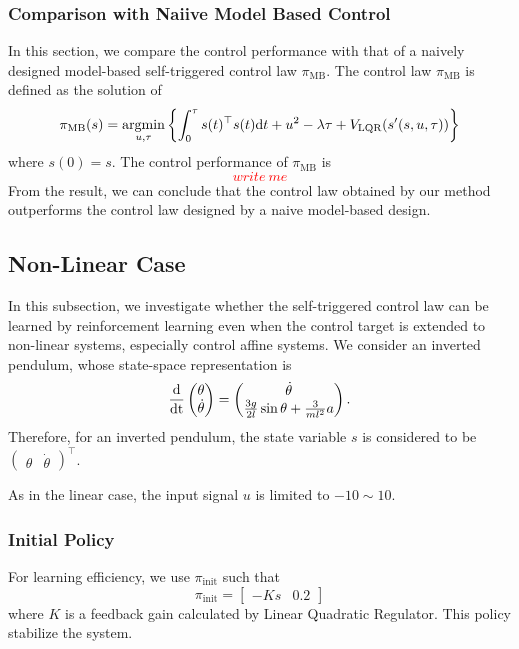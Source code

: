 \documentclass[english, dvipdfmx]{ampmt}             %
\newcommand{\unc}[1]{\textcolor{red}{#1}} %
\newcommand{\argmin}{\mathop{\rm argmin}\limits}
\newcommand{\odif}[2]{\frac{\rm{d}#1}{\rm{d}#2}}
\begin{document}
\subsubsection{Comparison with Naiive Model Based Control}
In this section, we compare the control performance with that of a naively designed model-based self-triggered control law $\pi_{\textrm{MB}}$. The control law $\pi_{\textrm{MB}}$ is defined as the solution of 
\begin{equation}
	\pi_{\textrm{MB}}(s) = \argmin_{u,\tau} \left\{\int_{0}^{\tau} s(t)^{\top}s(t)\textrm{d}t + u^2 - \lambda\tau + V_{\textrm{LQR}}(s^{\prime}(s,u,\tau))\right\}
\end{equation}
where $s(0) = s$. The control performance of $\pi_{\textrm{MB}}$ is 
\unc{
\begin{equation}
	write~me
\end{equation}
}
From the result, we can conclude that the control law obtained by our method outperforms the control law designed by a naive model-based design.


\subsection{Non-Linear Case}
In this subsection, we investigate whether the self-triggered control law can be learned by reinforcement learning even when the control target is extended to non-linear systems, especially control affine systems. We consider an inverted pendulum, whose state-space representation is
\begin{equation}
	\odif{}{t}\begin{pmatrix}\theta \\ \dot{\theta}\end{pmatrix} = 
		\begin{pmatrix}\dot{\theta} \\ \frac{3g}{2l}\sin{\theta} + \frac{3}{ml^2}a \end{pmatrix} \label{pendulum}.
\end{equation}
Therefore, for an inverted pendulum, the state variable $s$ is considered to be $\begin{pmatrix}\theta & \dot{\theta}\end{pmatrix}^{\top}$.
\par
As in the linear case, the input signal $u$ is limited to $-10 \sim 10$.

\subsubsection{Initial Policy}
For learning efficiency, we use $\pi_{\textrm{init}}$ such that
\begin{equation}
	\pi_{\textrm{init}} = \begin{bmatrix}-Ks&0.2\end{bmatrix}
\end{equation}
where $K$ is a feedback gain calculated by Linear Quadratic Regulator. This policy stabilize the system.
\end{document}
